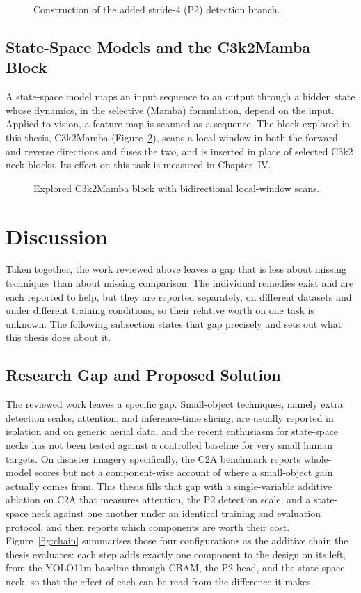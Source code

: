 \begin{figure}[tbp]
  \centering
  \caption{Construction of the added stride-4 (P2) detection branch.}
  \label{fig:p2}
\end{figure}

\subsection{State-Space Models and the C3k2Mamba Block}
A state-space model maps an input sequence to an output through a hidden state
whose dynamics, in the selective (Mamba) formulation, depend on the input. Applied
to vision, a feature map is scanned as a sequence. The block explored in this
thesis, C3k2Mamba (Figure~\ref{fig:mamba}), scans a local window in both the forward
and reverse directions and fuses the two, and is inserted in place of selected C3k2
neck blocks. Its effect on this task is measured in Chapter~IV.

\begin{figure}[tbp]
  \centering
  \caption{Explored C3k2Mamba block with bidirectional local-window scans.}
  \label{fig:mamba}
\end{figure}

\section{Discussion}

Taken together, the work reviewed above leaves a gap that is less about missing
techniques than about missing comparison. The individual remedies exist and are
each reported to help, but they are reported separately, on different datasets
and under different training conditions, so their relative worth on one task is
unknown. The following subsection states that gap precisely and sets out what
this thesis does about it.

\subsection{Research Gap and Proposed Solution}
The reviewed work leaves a specific gap. Small-object techniques, namely extra
detection scales, attention, and inference-time slicing, are usually reported in
isolation and on generic aerial data, and the recent enthusiasm for state-space
necks has not been tested against a controlled baseline for very small human
targets. On disaster imagery specifically, the C2A benchmark reports whole-model
scores but not a component-wise account of where a small-object gain actually comes
from. This thesis fills that gap with a single-variable additive ablation on C2A
that measures attention, the P2 detection scale, and a state-space neck against one
another under an identical training and evaluation protocol, and then reports which
components are worth their cost. Figure~\ref{fig:chain} summarises those four
configurations as the additive chain the thesis evaluates: each step adds
exactly one component to the design on its left, from the YOLO11m baseline
through CBAM, the P2 head, and the state-space neck, so that the effect of each
can be read from the difference it makes.

